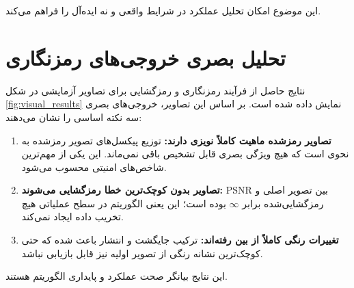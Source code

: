 \documentclass[a4paper,12pt]{report}
\renewcommand{\%}{\lr{\oldpercent}}
\providecommand{\lr}[1]{#1}
\begin{document}
این موضوع امکان تحلیل عملکرد در شرایط واقعی و نه ایده‌آل را فراهم می‌کند.

\section{تحلیل بصری خروجی‌های رمزنگاری}
نتایج حاصل از فرآیند رمزنگاری و رمزگشایی برای تصاویر آزمایشی در شکل \ref{fig:visual_results} نمایش داده شده است. بر اساس این تصاویر، خروجی‌های بصری سه نکته اساسی را نشان می‌دهند:

\begin{enumerate}
    \item \textbf{تصاویر رمزشده ماهیت کاملاً نویزی دارند:} توزیع پیکسل‌های تصویر رمزشده به نحوی است که هیچ ویژگی بصری قابل تشخیص باقی نمی‌ماند. این یکی از مهم‌ترین شاخص‌های امنیتی محسوب می‌شود.
    \item \textbf{تصاویر بدون کوچک‌ترین خطا رمزگشایی می‌شوند:} \lr{PSNR} بین تصویر اصلی و رمزگشایی‌شده برابر $\infty$ بوده است؛ این یعنی الگوریتم در سطح عملیاتی هیچ تخریب داده ایجاد نمی‌کند.
    \item \textbf{تغییرات رنگی کاملاً از بین رفته‌اند:} ترکیب جایگشت و انتشار باعث شده که حتی کوچک‌ترین نشانه رنگی از تصویر اولیه نیز قابل بازیابی نباشد.
\end{enumerate}

این نتایج بیانگر صحت عملکرد و پایداری الگوریتم هستند.
\end{document}
